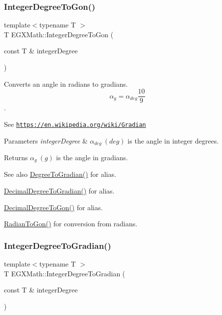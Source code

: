 \subsubsection{\texorpdfstring{Integer\+Degree\+To\+Gon()}{IntegerDegreeToGon()}}
{\footnotesize\ttfamily template$<$typename T $>$ \\
T E\+G\+X\+Math\+::\+Integer\+Degree\+To\+Gon (\begin{DoxyParamCaption}\item[{const T \&}]{integer\+Degree }\end{DoxyParamCaption})}



Converts an angle in radians to gradians. \[\alpha_{g}=\alpha_{deg}\frac{10}{9}\]. 

See \href{https://en.wikipedia.org/wiki/Gradian}{\tt https\+://en.\+wikipedia.\+org/wiki/\+Gradian} 
\begin{DoxyParams}{Parameters}
{\em integer\+Degree} & $\alpha_{deg}\ (deg)$ is the angle in integer degrees. \\
\hline
\end{DoxyParams}
\begin{DoxyReturn}{Returns}
$\alpha_{g}\ (g)$ is the angle in gradians. 
\end{DoxyReturn}
\begin{DoxySeeAlso}{See also}
\mbox{\hyperlink{group___e_g_x_math-_angle_conversions-_degree_ga25bb5506b3f66fff7a1b85bf7bd795b3}{Degree\+To\+Gradian()}} for alias. 

\mbox{\hyperlink{group___e_g_x_math-_angle_conversions-_decimal_degree_ga3ac6f1ceb36a4938cdf3b55554734c99}{Decimal\+Degree\+To\+Gradian()}} for alias. 

\mbox{\hyperlink{group___e_g_x_math-_angle_conversions-_decimal_degree_gaeb333a1ad0aeb913c025fbd1be85fcb3}{Decimal\+Degree\+To\+Gon()}} for alias. 

\mbox{\hyperlink{group___e_g_x_math-_angle_conversions-_radian_ga36912e5a810b64c271c4dafc17f4ca45}{Radian\+To\+Gon()}} for conversion from radians. 
\end{DoxySeeAlso}
\mbox{\label{group___e_g_x_math-_angle_conversions-_integer_degree_ga47127467ff7a8ef57f6be9ce496a97df}} 
\subsubsection{\texorpdfstring{Integer\+Degree\+To\+Gradian()}{IntegerDegreeToGradian()}}
{\footnotesize\ttfamily template$<$typename T $>$ \\
T E\+G\+X\+Math\+::\+Integer\+Degree\+To\+Gradian (\begin{DoxyParamCaption}\item[{const T \&}]{integer\+Degree }\end{DoxyParamCaption})}



